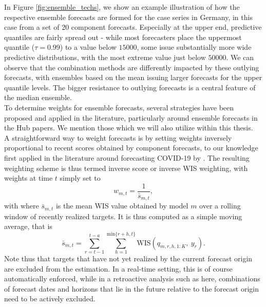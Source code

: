 In Figure \ref{fig:ensemble_techs}, we show an example illustration of how the respective ensemble forecasts are formed for the case series in Germany, in this case from a set of 20 component forecasts. Especially at the upper end, predictive quantiles are fairly spread out - while most forecasters place the uppermost quantile ($\tau = 0.99$) to a value below $15000$, some issue substantially more wide predictive distributions, with the most extreme value just below $50000$. We can observe that the combination methods are differently impacted by these outlying forecasts, with ensembles based on the mean issuing larger forecasts for the upper quantile levels. The bigger resistance to outlying forecasts is a central feature of the median ensemble. \\
To determine weights for ensemble forecasts, several strategies have been proposed and applied in the literature, particularly around ensemble forecasts in the Hub papers. We mention those which we will also utilize within this thesis. \\
A straightforward way to weight forecasts is by setting weights inversely proportional to recent scores obtained by component forecasts, to our knowledge first applied in the literature around forecasting COVID-19 by \cite{bracher_pre-registered_2021}. The resulting weighting scheme is thus termed inverse score or inverse WIS weighting, with weights at time $t$ simply set to 
\begin{equation}
w_{m,t} = \frac{1}{\bar{s}_{m, t}},
\end{equation}
with
where $\bar{s}_{m, t}$ is the mean WIS value obtained by model $m$ over a rolling window of recently realized targets. It is thus computed as a simple moving average, that is
\begin{equation}
\bar{s}_{m,t} = \sum_{r = t-1}^{t-a}\sum_{h = 1}^{\text{min}\{r+h, t\}} \text{WIS}(q_{m, r, h, 1:K}, \ y_r).
\end{equation}
Note thus that targets that have not yet realized by the current forecast origin are excluded from the estimation. In a real-time setting, this is of course automatically enforced, while in a retroactive analysis such as here, combinations of forecast dates and horizons that lie in the future relative to the forecast origin need to be actively excluded.
